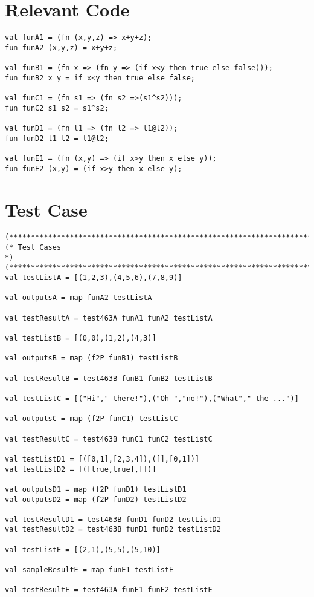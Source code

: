 \documentclass{report}
\begin{document}
\section{Relevant Code}
\label{rel-code-4.6.3}
\begin{lstlisting}[frame=TB]
val funA1 = (fn (x,y,z) => x+y+z);
fun funA2 (x,y,z) = x+y+z;

val funB1 = (fn x => (fn y => (if x<y then true else false)));
fun funB2 x y = if x<y then true else false;

val funC1 = (fn s1 => (fn s2 =>(s1^s2)));
fun funC2 s1 s2 = s1^s2;

val funD1 = (fn l1 => (fn l2 => l1@l2));
fun funD2 l1 l2 = l1@l2;

val funE1 = (fn (x,y) => (if x>y then x else y));
fun funE2 (x,y) = (if x>y then x else y);

\end{lstlisting}

\section{Test Case}
\label{test-results-4.6.3}
\begin{lstlisting}[frame=TB]
(******************************************************************************)
(* Test Cases																  *)
(******************************************************************************)
val testListA = [(1,2,3),(4,5,6),(7,8,9)]

val outputsA = map funA2 testListA

val testResultA = test463A funA1 funA2 testListA

val testListB = [(0,0),(1,2),(4,3)]

val outputsB = map (f2P funB1) testListB

val testResultB = test463B funB1 funB2 testListB

val testListC = [("Hi"," there!"),("Oh ","no!"),("What"," the ...")]

val outputsC = map (f2P funC1) testListC

val testResultC = test463B funC1 funC2 testListC

val testListD1 = [([0,1],[2,3,4]),([],[0,1])]
val testListD2 = [([true,true],[])]

val outputsD1 = map (f2P funD1) testListD1
val outputsD2 = map (f2P funD2) testListD2

val testResultD1 = test463B funD1 funD2 testListD1
val testResultD2 = test463B funD1 funD2 testListD2

val testListE = [(2,1),(5,5),(5,10)]

val sampleResultE = map funE1 testListE

val testResultE = test463A funE1 funE2 testListE

\end{lstlisting}
\end{document}
